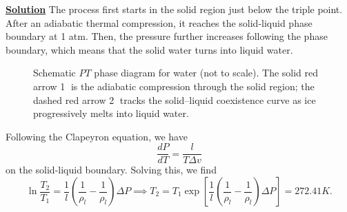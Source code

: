 \noindent \underline{\textbf{Solution}} The process first starts in the solid region just below the triple point. After an adiabatic thermal compression, it reaches the solid-liquid phase boundary at 1 atm. Then, the pressure further increases following the phase boundary, which means that the solid water turns into liquid water. 

\begin{figure}[htbp]
\centering
{}
\caption{Schematic $PT$ phase diagram for water (not to scale). The solid
red arrow \textcircled{1} is the adiabatic compression through the solid
region; the dashed red arrow \textcircled{2} tracks the solid--liquid
coexistence curve as ice progressively melts into liquid water.}
\label{fig:PT-schematic}
\end{figure}

Following the Clapeyron equation, we have
\begin{equation}
    \frac{dP}{dT} = \frac{l}{T\Delta v}
\end{equation}
on the solid-liquid boundary. Solving this, we find 
\begin{equation}
    \ln\frac{T_2}{T_1} = \frac{1}{l}\left(\frac{1}{\rho_l}-\frac{1}{\rho_l}\right)\Delta P \implies T_2 = T_1\exp\left[\frac{1}{l}\left(\frac{1}{\rho_l}-\frac{1}{\rho_l}\right)\Delta P\right] = 272.41 \si{K}.
\end{equation}

